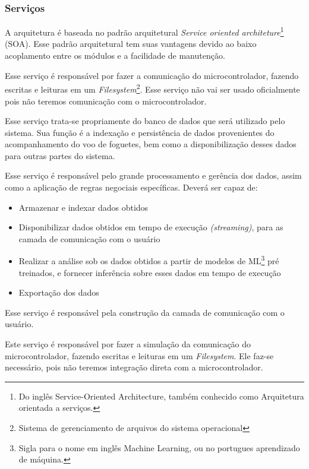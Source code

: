 \subsubsection{Serviços}
A arquitetura é baseada no padrão arquitetural \textit{Service oriented architeture}\footnote{Do inglês Service-Oriented Architecture, também conhecido como Arquitetura orientada a serviços.\cite{bieberstein2006service}} (SOA). Esse padrão arquitetural tem suas vantagens devido ao baixo acoplamento entre os módulos e a facilidade de manutenção.

Esse serviço é responsável por fazer a comunicação do microcontrolador, fazendo escritas e leituras em um \textit{Filesystem}\footnote{Sistema de gerenciamento de arquivos do sistema operacional}. Esse serviço não vai ser usado oficialmente pois não teremos comunicação com o microcontrolador.


Esse serviço trata-se propriamente do banco de dados que será utilizado pelo sistema. Sua função é a indexação e persistência de dados provenientes do acompanhamento do voo de foguetes, bem como a disponibilização desses dados para outras partes do sistema.

Esse serviço é responsável pelo grande processamento e gerência dos dados, assim como a aplicação de regras negociais específicas. Deverá ser capaz de:
\begin{itemize}
    \item Armazenar e indexar dados obtidos
    \item Disponibilizar dados obtidos em tempo de execução \textit{(streaming)}, para as camada de comunicação com o usuário
    \item Realizar a análise sob os dados obtidos a partir de modelos de ML\footnote{Sigla para  o nome em inglês Machine Learning, ou no portugues aprendizado de máquina.} pré treinados, e fornecer inferência sobre esses dados em tempo de execução
    \item Exportação dos dados
\end{itemize}

Esse serviço é responsável pela construção da camada de comunicação com o usuário.

Este serviço é responsável por fazer a simulação da comunicação do microcontrolador, fazendo escritas e leituras em um \textit{Filesystem}. Ele faz-se necessário, pois não teremos integração direta com a microcontrolador.

